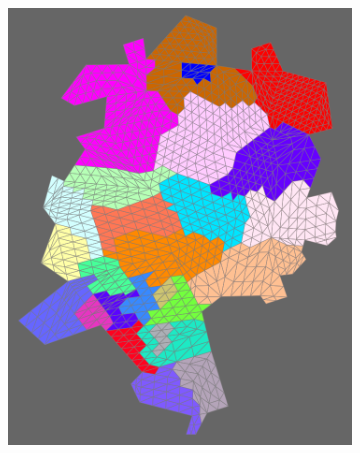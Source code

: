 \begin{figure}
	\begin{center}
		\begin{subfigure}[b]{0.4\textwidth}
			\includegraphics[width=\textwidth]{./figures/grid.png}
		\end{subfigure}
		\begin{subfigure}[b]{0.4\textwidth}

\end{subfigure}
\end{center}
\end{figure}
